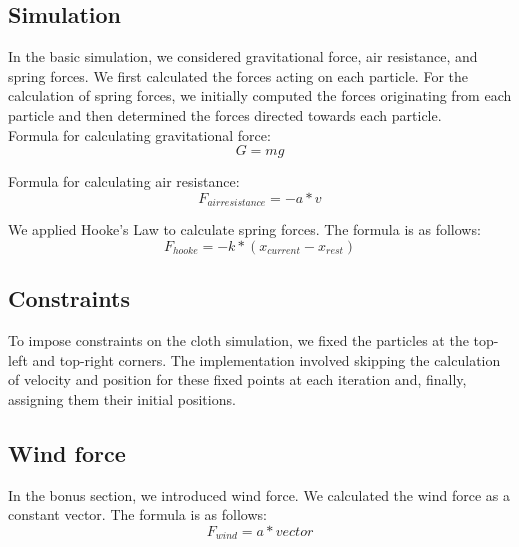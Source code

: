 \documentclass[acmtog]{acmart}
\begin{document}
\subsection{Simulation}
In the basic simulation, we considered gravitational force, air resistance, and spring forces. We first calculated the forces acting on each particle. For the calculation of spring forces, we initially computed the forces originating from each particle and then determined the forces directed towards each particle.
\\
Formula for calculating gravitational force:
$$ G = mg$$

Formula for calculating air resistance:
$$ F_{air resistance} = -a*v$$

We applied Hooke's Law to calculate spring forces. The formula is as follows:
$$F_{hooke} = -k*(x_{current} - x_{rest}) $$

\subsection{Constraints}
To impose constraints on the cloth simulation, we fixed the particles at the top-left and top-right corners. The implementation involved skipping the calculation of velocity and position for these fixed points at each iteration and, finally, assigning them their initial positions.

\subsection{Wind force}
In the bonus section, we introduced wind force. We calculated the wind force as a constant vector. The formula is as follows:
$$ F_{wind} = a * vector$$
\end{document}
